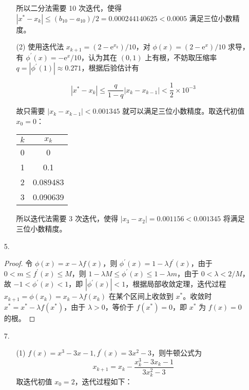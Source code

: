 \documentclass{sjtuarticle}
\begin{document}
\begin{itemize}
\begin{solution}
\begin{enumerate}
    所以二分法需要 10 次迭代，使得$|x^*-x_k|\leq(b_{10}-a_{10})/2=0.000244140625<0.0005$ 满足三位小数精度。
    \item[(2)] 使用迭代法 $x_{k+1}=(2-\mathrm{e}^{x_k})/10$，对 $\phi(x)=(2-\mathrm{e}^{x})/10$ 求导，有 $\phi^\prime(x)=-\mathrm{e}^x/10$，认为其在 $(0,1)$ 上有根，不妨取压缩率 $q=|\phi^\prime(1)|\approx 0.271$，根据后验估计有
    
    \begin{equation*}
        |x^*-x_k|\leq \frac{q}{1-q} |x_k-x_{k-1}|<\frac{1}{2}\times 10^{-3}
    \end{equation*}

    故只需要 $|x_k-x_{k-1}|<0.001345$ 就可以满足三位小数精度。取迭代初值$x_0=0$：
    
    \begin{table}[H]
        \centering
        \begin{tabular}{cc}
            \hline
            $k$ & $x_k$ \\
            \hline
            0 & 0 \\
            1 & 0.1 \\
            2 & 0.089483 \\
            3 & 0.090639 \\
            \hline
        \end{tabular}
    \end{table}

    所以迭代法需要 3 次迭代，使得 $|x_3-x_2|=0.001156<0.001345$ 将满足三位小数精度。

    \end{enumerate}
    \end{solution}
    \item[5.] \begin{proof}
        令 $\phi(x)=x-\lambda f(x)$，则 $\phi^\prime(x)=1-\lambda f^\prime(x)$，由于 $0<m\leq f^\prime (x)\leq M$，则 $1-\lambda M\leq\phi^\prime(x)\leq1-\lambda m$，由于 $0<\lambda<2/M$，故 $-1<\phi^\prime (x)<1$，即 $|\phi^\prime(x)|<1$，根据局部收敛定理，迭代过程 $x_{k+1}=\phi(x_k)=x_k-\lambda f(x_k)$ 在某个区间上收敛到 $x^*$。收敛时 $x^*=x^*-\lambda f(x^*)$，由于 $\lambda>0$，等价于 $f(x^*)=0$，即 $x^*$ 为 $f(x)=0$ 的根。
    \end{proof}
    \item[7.] \begin{solution}
        \begin{itemize}
            \item[(1)] $f(x)=x^3-3x-1, f^\prime(x)=3x^2-3$，则牛顿公式为
            \begin{equation*}
                x_{k+1}=x_k-\frac{x_k^3-3x_k-1}{3x_k^2-3}
            \end{equation*}
            取迭代初值 $x_0=2$，迭代过程如下：
            

\end{itemize}
\end{solution}
\end{itemize}
\end{document}
